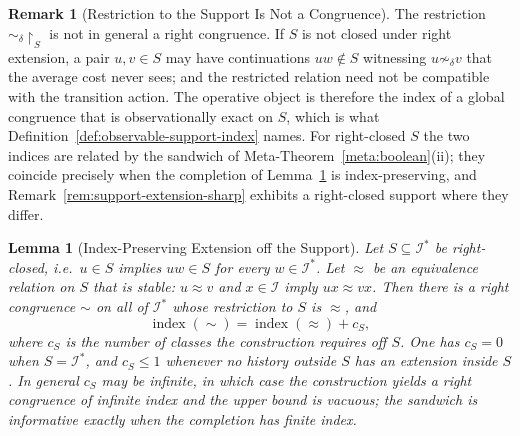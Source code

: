 \documentclass[12pt]{article}
\newtheorem{lemma}[theorem]{Lemma}
\theoremstyle{definition}
\newtheorem{remark}[theorem]{Remark}
\begin{document}
\begin{remark}[Restriction to the Support Is Not a Congruence]
\label{rem:support-restriction-scope}
The restriction $\sim_\delta\!\restriction_S$ is not in general a right
congruence.  If $S$ is not closed under right extension, a pair $u,v\in S$ may
have continuations $uw\notin S$ witnessing $u\not\sim_\delta v$ that the
average cost never sees; and the restricted relation need not be compatible
with the transition action.  The operative object is therefore the index of a
global congruence that is observationally exact on $S$, which is what
Definition~\ref{def:observable-support-index} names.  For right-closed $S$ the
two indices are related by the sandwich of
Meta-Theorem~\ref{meta:boolean}(ii); they coincide precisely when the
completion of Lemma~\ref{lem:support-extension} is index-preserving, and
Remark~\ref{rem:support-extension-sharp} exhibits a right-closed support where
they differ.
\end{remark}

\begin{lemma}[Index-Preserving Extension off the Support]
\label{lem:support-extension}
Let $S\subseteq\mathcal I^*$ be right-closed, i.e.\ $u\in S$ implies $uw\in S$
for every $w\in\mathcal I^*$.  Let $\approx$ be an equivalence relation on $S$
that is \emph{stable}: $u\approx v$ and $x\in\mathcal I$ imply $ux\approx vx$.
Then there is a right congruence $\sim$ on all of $\mathcal I^*$ whose
restriction to $S$ is $\approx$, and
\[
\operatorname{index}(\sim)
=
\operatorname{index}(\approx)+c_S ,
\]
where $c_S$ is the number of classes the construction requires off $S$.  One
has $c_S=0$ when $S=\mathcal I^*$, and $c_S\le1$ whenever no history outside
$S$ has an extension inside $S$.  In general $c_S$ may be infinite, in which
case the construction yields a right congruence of infinite index and the
upper bound is vacuous; the sandwich is informative exactly when the
completion has finite index.
\end{lemma}
\end{document}
